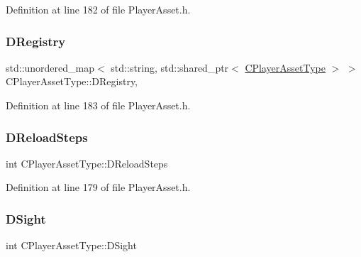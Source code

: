 Definition at line 182 of file Player\+Asset.\+h.

\hypertarget{classCPlayerAssetType_a24f4ccd06fbddacc936e31a2f1f12ed5}{}\label{classCPlayerAssetType_a24f4ccd06fbddacc936e31a2f1f12ed5} 
\subsubsection{\texorpdfstring{D\+Registry}{DRegistry}}
{\footnotesize\ttfamily std\+::unordered\+\_\+map$<$ std\+::string, std\+::shared\+\_\+ptr$<$ \hyperlink{classCPlayerAssetType}{C\+Player\+Asset\+Type} $>$ $>$ C\+Player\+Asset\+Type\+::\+D\+Registry\hspace{0.3cm}{\ttfamily [static]}, {\ttfamily [protected]}}



Definition at line 183 of file Player\+Asset.\+h.

\hypertarget{classCPlayerAssetType_a192d6ac421608663d18d1a0cda00841e}{}\label{classCPlayerAssetType_a192d6ac421608663d18d1a0cda00841e} 
\subsubsection{\texorpdfstring{D\+Reload\+Steps}{DReloadSteps}}
{\footnotesize\ttfamily int C\+Player\+Asset\+Type\+::\+D\+Reload\+Steps\hspace{0.3cm}{\ttfamily [protected]}}



Definition at line 179 of file Player\+Asset.\+h.

\hypertarget{classCPlayerAssetType_afa32c3f45737443299a4e681dfe64911}{}\label{classCPlayerAssetType_afa32c3f45737443299a4e681dfe64911} 
\subsubsection{\texorpdfstring{D\+Sight}{DSight}}
{\footnotesize\ttfamily int C\+Player\+Asset\+Type\+::\+D\+Sight\hspace{0.3cm}{\ttfamily [protected]}}



